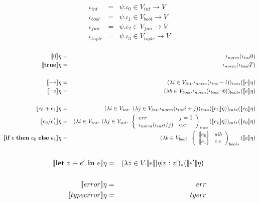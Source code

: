       \begin{eqnarray*}
        \iota_{int} &=& \psi . \iota_{0} \in V_{int} \rightarrow V \\
        \iota_{bool} &=& \psi . \iota_{1} \in V_{bool} \rightarrow V \\
        \iota_{fun} &=& \psi . \iota_{2} \in V_{fun} \rightarrow V \\
        \iota_{tuple} &=& \psi . \iota_{3} \in V_{tuple} \rightarrow V \\
      \end{eqnarray*}

      \begin{eqnarray*}
        \se{0}\eta &=& \iota_{norm}(\iota_{int} 0) \\
        \se{\textbf{true}}\eta &=& \iota_{norm}(\iota_{bool} T) \\ \\
        \se{-e}\eta &=& (\lambda i \in V_{int}. \iota_{norm}(\iota_{int} -i))_{int*}(\se{e}\eta) \\
        \se{\neg e}\eta &=& (\lambda b \in V_{bool}. \iota_{norm}(\iota_{bool} \neg b))_{bool*}(\se{e}\eta) \\ \\
        \se{e_0+e_1}\eta &=& (\lambda i \in V_{int}.\ (\lambda j \in V_{int}. \iota_{norm}(\iota_{int} i+j))_{int*}(\se{e_1}\eta))_{int*}(\se{e_0}\eta) \\
        \se{e_0/e_1'}\eta &=& (\lambda i \in V_{int}. \ (\lambda j \in V_{int}. \ \left\lbrace 
        \begin{array}{lll}
          err & j = 0 \\
          \iota_{norm}(\iota_{int} i/j) & c.c
        \end{array}\right)_{int*} (\se{e_1}\eta))_{int*} (\se{e_0}\eta) \\
        \se{\IF{e}{e_0}{e_1}}\eta &=& (\lambda b \in V_{bool}. \ \left\lbrace 
        \begin{array}{lll}
          \se{e_0} & si b \\
          \se{e_1} & c.c \\
        \end{array}\right)_{bool*} (\se{e}\eta) \\ \\
      \end{eqnarray*}
      \begin{eqnarray*}
        \se{\textbf{let} \ v \equiv e' \textbf{ in } e}\eta &=& (\lambda z \in V. \se{e}[\eta | v : z])_{\ast}(\se{e'}\eta) \\ \\
        \se{error}\eta &=& err \\
        \se{typeerror}\eta &=& tyerr
      \end{eqnarray*}

